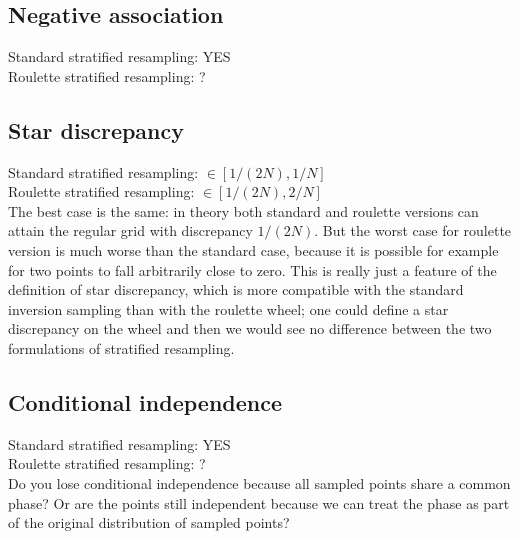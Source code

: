 \documentclass[fleqn]{article}
\newcommand{\1}[1]{\mathbb{I}_{#1}}
\begin{document}
\subsection*{Negative association}
Standard stratified resampling: YES\\
Roulette stratified resampling: ?


\subsection*{Star discrepancy}
Standard stratified resampling: $\in [1/(2N), 1/N]$\\
Roulette stratified resampling: $\in [1/(2N), 2/N]$\\[5pt]
The best case is the same: in theory both standard and roulette versions can attain the regular grid with discrepancy $1/(2N)$.
But the worst case for roulette version is much worse than the standard case, because it is possible for example for two points to fall arbitrarily close to zero. 
This is really just a feature of the definition of star discrepancy, which is more compatible with the standard inversion sampling than with the roulette wheel; one could define a star discrepancy on the wheel and then we would see no difference between the two formulations of stratified resampling.


\subsection*{Conditional independence}
Standard stratified resampling: YES\\
Roulette stratified resampling: ?\\[5pt]
Do you lose conditional independence because all sampled points share a common phase? Or are the points still independent because we can treat the phase as part of the original distribution of sampled points?









\printbibliography
\end{document}
